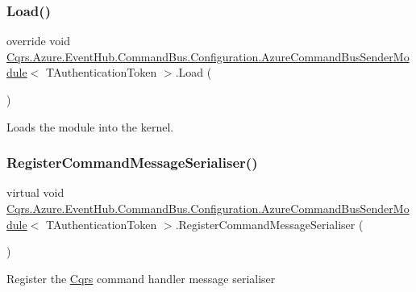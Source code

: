 \subsubsection{\texorpdfstring{Load()}{Load()}}
{\footnotesize\ttfamily override void \hyperlink{classCqrs_1_1Azure_1_1EventHub_1_1CommandBus_1_1Configuration_1_1AzureCommandBusSenderModule}{Cqrs.\+Azure.\+Event\+Hub.\+Command\+Bus.\+Configuration.\+Azure\+Command\+Bus\+Sender\+Module}$<$ T\+Authentication\+Token $>$.Load (\begin{DoxyParamCaption}{ }\end{DoxyParamCaption})}



Loads the module into the kernel. 

\mbox{\label{classCqrs_1_1Azure_1_1EventHub_1_1CommandBus_1_1Configuration_1_1AzureCommandBusSenderModule_a44c036f7db1cb79f28dbaa3801355aa4}} 
\subsubsection{\texorpdfstring{Register\+Command\+Message\+Serialiser()}{RegisterCommandMessageSerialiser()}}
{\footnotesize\ttfamily virtual void \hyperlink{classCqrs_1_1Azure_1_1EventHub_1_1CommandBus_1_1Configuration_1_1AzureCommandBusSenderModule}{Cqrs.\+Azure.\+Event\+Hub.\+Command\+Bus.\+Configuration.\+Azure\+Command\+Bus\+Sender\+Module}$<$ T\+Authentication\+Token $>$.Register\+Command\+Message\+Serialiser (\begin{DoxyParamCaption}{ }\end{DoxyParamCaption})\hspace{0.3cm}{\ttfamily [virtual]}}



Register the \hyperlink{namespaceCqrs}{Cqrs} command handler message serialiser 


